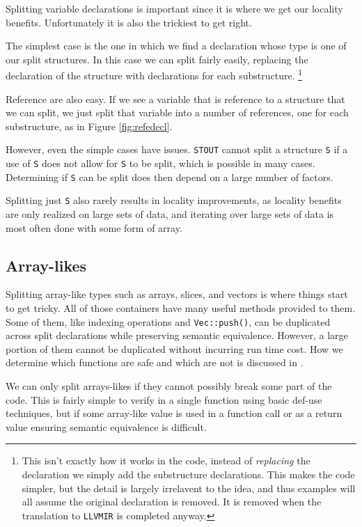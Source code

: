 \documentclass[12pt,oneside]{book}
\newcommand{\llvmirname}{{\texttt{LLVMIR}}}
\def \llvmir {\llvmirname{}\xspace}
\newcommand{\projectname}{{\texttt{STOUT}}}
\def \name{\projectname\xspace}
\begin{document}
Splitting variable declarations is important since it is where
we get our locality benefits. Unfortunately it is also the trickiest
to get right. 

The simplest case is the one in which
we find a declaration whose type is one of our split structures. In this 
case we can split fairly easily, replacing the declaration of the structure with
declarations for each substructure.
\footnote{This isn't exactly how it works in the code,
instead of \textit{replacing} the declaration we simply add the substructure declarations.
This makes the code simpler, but the detail is largely irrelavent to the
idea, and thus examples will all assume the original declaration is removed.
It is removed when the translation to \llvmir is completed anyway.}

Reference are also easy. If we see a variable that is reference to a structure 
that we can split, we just split that variable into a number of references, 
one for each substructure, as in Figure \ref{fig:refedecl}.

However, even the simple cases have issues. \name cannot split 
a structure \texttt{S} if a use of \texttt{S} does not
allow for \texttt{S} to be split, which is possible in many cases. 
Determining if
\texttt{S} can be split does then depend on a large number of factors.

Splitting just \texttt{S} also rarely results in locality improvements,
as locality benefits are only realized on large sets of data, and 
iterating over large sets of data is most often done with some 
form of array.

\subsection{Array-likes}

Splitting array-like types such as 
arrays, slices, and vectors is where things start
to get tricky. All of those containers have many useful methods
provided to them. Some of them, like indexing operations 
and \texttt{Vec::push()}, can be duplicated across split declarations
while preserving semantic equivalence. However, a large portion of them
cannot be duplicated without incurring run time cost. How we determine which
functions are safe and which are not is discussed in .

We can only split arrays-likes if they cannot possibly
break some part of the code. This is fairly simple to verify
in a single function using basic def-use techniques, but
if some array-like value is used in a function call or as 
a return value ensuring semantic equivalence is difficult.
\end{document}
